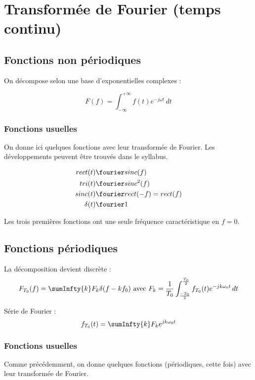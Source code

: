 \section{Transformée de Fourier (temps continu)}
    \subsection{Fonctions non périodiques}
        On décompose selon une base d'exponentielles complexes :

        $$
            F(f) = \int_{-\infty}^{+\infty} f(t) e^{-j\omega t}\,dt
        $$

        \subsubsection{Fonctions usuelles}
            On donne ici quelques fonctions avec leur transformée de Fourier. Les développements peuvent être trouvés dans le syllabus.

            \begin{align*}
                rect(t) &\fourier sinc(f)\\
                tri(t) &\fourier sinc^2(f)\\
                sinc(t) &\fourier rect(-f) = rect(f)\\
                \delta(t) &\fourier 1\\
            \end{align*}

            Les trois premières fonctions ont une seule fréquence caractéristique en $f = 0$.
        
    \subsection{Fonctions périodiques}
        La décomposition devient discrète :
        $$
            F_{T_0}(f) = \sumInfty{k} F_k \delta(f - kf_0) \mbox{ avec } F_k = \frac{1}{T_0}\int_{\frac{-T_0}{2}}^{\frac{T_0}{2}} f_{T_0}(t) e^{-jk\omega_0 t}\,dt
        $$

        Série de Fourier :
        $$
            f_{T_0}(t) = \sumInfty{k} F_k e^{jk\omega_0 t}
        $$

        \subsubsection{Fonctions usuelles}
            Comme précédemment, on donne quelques fonctions (périodiques, cette fois) avec leur transformée de Fourier.


